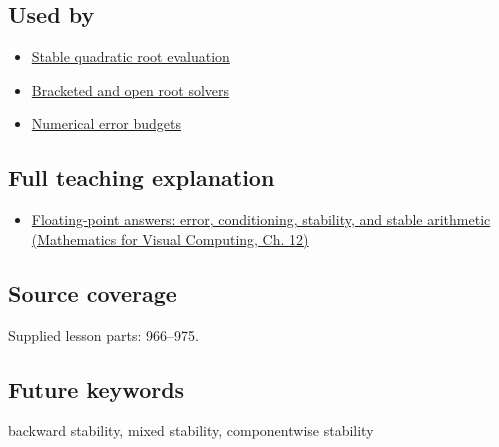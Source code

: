 \subsection{Used by}\label{appendix-aa2bf0d79639-used-by}

\begin{itemize}
\tightlist
\item
  \hyperref[appendix-b9afba7f63e5]{Stable quadratic root evaluation}
\item
  \hyperref[appendix-f63eb850796d]{Bracketed and open root solvers}
\item
  \hyperref[appendix-31b8c295e05f]{Numerical error budgets}
\end{itemize}

\subsection{Full teaching explanation}\label{appendix-aa2bf0d79639-full-teaching-explanation}

\begin{itemize}
\tightlist
\item
  \href{../02-Mathematics-for-Visual-Computing/main.pdf\#nameddest=02-foundations-ii-ch028-floating-point-answers-error-conditioning-stability-and-stable-arithmetic}{Floating-point answers: error, conditioning, stability, and stable arithmetic (Mathematics for Visual Computing, Ch. 12)}
\end{itemize}

\subsection{Source coverage}\label{appendix-aa2bf0d79639-source-coverage}

Supplied lesson parts: 966--975.

\subsection{Future keywords}\label{appendix-aa2bf0d79639-future-keywords}

backward stability, mixed stability, componentwise stability
